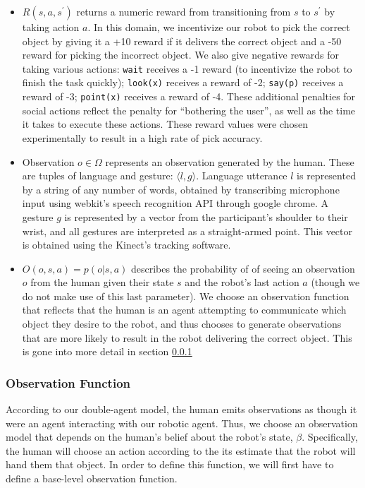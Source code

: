 \documentclass{article}
\begin{document}
\begin{multicols}{2}
\begin{itemize}
	\item $R(s, a, s^\prime)$ returns a numeric reward from transitioning from $s$ to $s^\prime$ by taking action $a$. In this domain, we incentivize our robot to pick the correct object by giving it a +10 reward if it delivers the correct object and a -50 reward for picking the incorrect object. We also give negative rewards for taking various actions: \texttt{wait} receives a -1 reward (to incentivize the robot to finish the task quickly); \texttt{look(x)} receives a reward of -2; \texttt{say(p)} receives a reward of -3; \texttt{point(x)}  receives a reward of -4. These additional penalties for social actions reflect the penalty for ``bothering the user'', as well as the time it takes to execute these actions. These reward values were chosen experimentally to result in a high rate of pick accuracy. 
	\item Observation $o \in \Omega$ represents an observation generated by the human. These are tuples of language and gesture: $\langle l, g \rangle$. Language utterance $l$ is represented by a string of any number of words, obtained by transcribing microphone input using webkit's speech recognition API through google chrome.  A gesture $g$ is represented by a vector from the participant's shoulder to their wrist, and all gestures are interpreted as a straight-armed point. This vector is obtained using the Kinect's tracking software. 
	\item $O(o, s, a) = p(o |s, a)$ describes the probability of of seeing an observation $o$ from the human given their state $s$ and the robot's last action $a$ (though we do not make use of this last parameter). We choose an observation function that reflects that the human is an agent attempting to communicate which object they desire to the robot, and thus chooses to generate observations that are more likely to result in the robot delivering the correct object. This is gone into more detail in section \ref{sssec:of}
\end{itemize}


\subsubsection{Observation Function} \label{sssec:of}

According to our double-agent model, the human emits observations as though it were an agent interacting with our robotic agent. Thus, we choose an observation model that depends on the human's belief about the robot's state, $\beta$. Specifically, the human will choose an action according to the its estimate that the robot will hand them that object. In order to define this function, we will first have to define a base-level observation function. 


\end{multicols}
\end{document}

